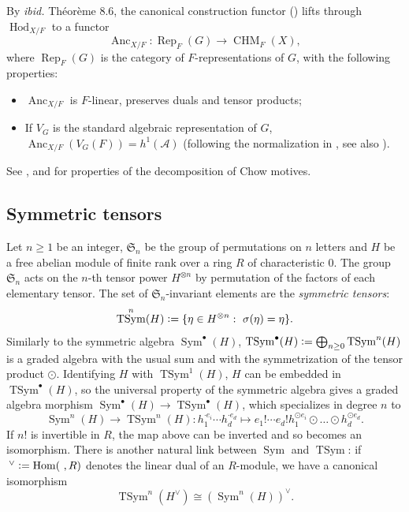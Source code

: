 \documentclass[a4paper]{amsart}
\makeatletter
\numberwithin{equation}{section}
\newcommand{\smallbullet}{}
\DeclareRobustCommand\smallbullet{
  \mathord{\mathpalette\smallbullet@{0.5}}
}
\newcommand{\smallbullet@}[2]{
  \vcenter{\hbox{\scalebox{#2}{$\m@th#1\bullet$}}}
}
\theoremstyle{definition}
\newcommand{\defeq}{\vcentcolon=}
\DeclareMathOperator{\Hom}{Hom}
\DeclareMathOperator{\TSym}{TSym}
\DeclareMathOperator{\Sym}{Sym}
\DeclareMathOperator{\Anc}{Anc}
\makeatother
\begin{document}
By \textit{ibid.} Théorème 8.6, the canonical construction functor (\cite[\S 1.18]{Pink}) lifts through $\operatorname{Hod}_{X/F}$ to a functor
\[\Anc_{X/F}\colon\operatorname{Rep}_F({G})\longrightarrow\operatorname{CHM}_F(X),\]where $\operatorname{Rep}_F({G})$ is the category of $F$-representations of ${G}$, with the following properties:
\begin{itemize}
\item $\Anc_{X/F}$ is $F$-linear, preserves duals and tensor products;
\item If $V_{G}$ is the standard algebraic representation of ${G}$, $\Anc_{X/F}(V_{G}(F))=h^1(\mathcal{A})$ (following the normalization in \cite[Remark 6.2.3]{LoefflerSkinnerZerbes}, see also \cite[\S 8]{Torzewski}).
\end{itemize}
See \cite{CortiHanamura}, \cite{DeningerMurre} and \cite[\S2]{Ancona} for properties of the decomposition of Chow motives.

\subsection{Symmetric tensors}\label{subsec.TSym}
Let $n\ge 1$ be an integer, $\mathfrak{S}_n$ be the group of permutations on $n$ letters and $H$ be a free abelian module of finite rank over a ring $R$ of characteristic 0. The group $\mathfrak{S}_n$ acts on the $n$-th tensor power $H^{\otimes n}$ by permutation of the factors of each elementary tensor. The set of $\mathfrak{S}_n$-invariant elements are the \textit{symmetric tensors}:\[\TSym^{n}(H)\defeq \{\eta\in H^{\otimes n}:\ \sigma(\eta)=\eta\}.\]
Similarly to the symmetric algebra $\Sym^\bullet(H)$, $\TSym^{\bullet}(H)\defeq\bigoplus_{n\ge 0}\TSym^{n}(H)$ is a graded algebra with the usual sum and with the symmetrization of the tensor product $\odot$. Identifying $H$ with $\TSym^1(H)$, $H$ can be embedded in $\TSym^{\bullet}(H)$, so the universal property of the symmetric algebra gives a graded algebra morphism $\Sym^{\bullet}(H)\to\TSym^{\bullet}(H)$, which specializes in degree $n$ to \[\Sym^{n}(H)\longrightarrow\TSym^{n}(H)\colon h_1^{\cdot e_i}\cdots h_d^{\cdot e_d} \longmapsto e_1!\cdots e_d! h_1^{\odot e_i}\odot\dots\odot h_d^{\odot e_d}.\]
If $n!$ is invertible in $R$, the map above can be inverted and so becomes an isomorphism. There is another natural link between $\Sym$ and $\TSym$: if $\smallbullet\,^\vee\defeq\Hom(\,\smallbullet\,,R)$ denotes the linear dual of an $R$-module, we have a canonical isomorphism
\begin{equation}\label{eq.IsomSymTSym}
\TSym^{n}(H^\vee)\cong\left(\Sym^{n}(H)\right)^\vee.
\end{equation}
\end{document}
